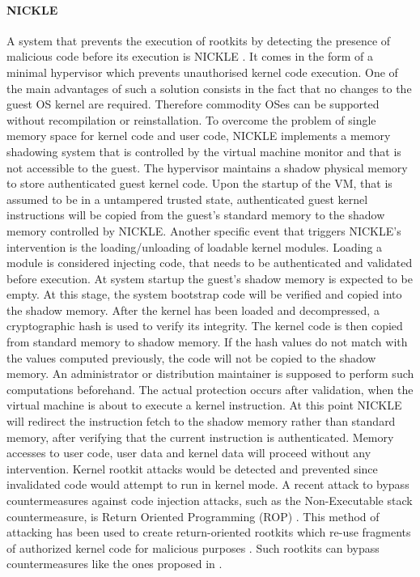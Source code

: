 \paragraph{NICKLE}
A system that prevents the execution of rootkits by detecting the presence of malicious code before its execution is NICKLE \cite{NICKLE}. It comes in the form of a minimal hypervisor which prevents unauthorised kernel code execution. One of the main advantages of such a solution consists in the fact that no changes to the guest OS kernel are required. Therefore commodity OSes can be supported without recompilation or reinstallation. 
To overcome the problem of single memory space for kernel code and user code, NICKLE implements a memory shadowing system that is controlled by the virtual machine monitor and that is not accessible to the guest. 
The hypervisor maintains a shadow physical memory to store authenticated guest kernel code. Upon the startup of the VM, that is assumed to be in a untampered trusted state, authenticated guest kernel instructions will be copied from the guest's standard memory to the shadow memory controlled by NICKLE. Another specific event that triggers NICKLE's intervention is the loading/unloading of loadable kernel modules. Loading a module is  considered injecting code, that needs to be authenticated and validated before execution. 
At system startup the guest's shadow memory is expected to be empty. At this stage, the system bootstrap code will be verified and copied into the shadow memory. After the kernel has been loaded and decompressed, a cryptographic hash is used to verify its integrity. The kernel code is then copied from standard memory to shadow memory. If the hash values do not match with the values computed previously, the code will not be copied to the shadow memory. An administrator or distribution maintainer is supposed to perform such computations beforehand.
The actual protection occurs after validation, when the virtual machine is about to execute a kernel instruction. At this point NICKLE will redirect the instruction fetch to the shadow memory rather than standard memory, after verifying that the current instruction is authenticated. 
Memory accesses to user code, user data and kernel data will proceed without any intervention. 
Kernel rootkit attacks would be detected and prevented since invalidated code would attempt to run in kernel mode.   
A recent attack to bypass countermeasures against code injection attacks, such as the Non-Executable stack countermeasure, is Return Oriented Programming (ROP) \cite{geometry}. This method of attacking has been used to create return-oriented rootkits which re-use fragments of authorized kernel code for malicious purposes \cite{Hund2009}. Such rootkits can bypass countermeasures like the ones proposed in \cite{NICKLE, SecVisor}.


